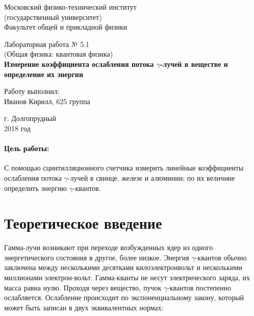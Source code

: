 \documentclass[12pt]{kiarticle}
\begin{document}
	
	\begin{titlepage}
		\begin{center}
			\large 	Московский физико-технический институт \\
			(государственный университет) \\
			Факультет общей и прикладной физики \\
			\vspace{0.2cm}
			
			\vspace{4.5cm}
			Лабораторная работа № 5.1 \\ \vspace{0.2cm}
			\large (Общая физика: квантовая физика) \\ \vspace{0.2cm}
			\LARGE \textbf{Измерение коэффициента ослабления потока $ \gamma $-лучей в веществе и определение их энергии}
		\end{center}
		\vspace{2.3cm} \large
		
		\begin{center}
			Работу выполнил: \\
			Иванов Кирилл,
			625 группа
			\vspace{10mm}		
			
		\end{center}
		
		\begin{center} \vspace{60mm}
			г. Долгопрудный \\
			2018 год
		\end{center}
	\end{titlepage}

	
	\paragraph*{Цель работы:} С помощью сцинтилляционного счетчика измерить линейные коэффициенты ослабления потока $ \gamma $-лучей в свинце, железе и алюминии; по их величине определить энергию $ \gamma $-квантов.
	
	\section{Теоретическое введение}
	
	Гамма-лучи возникают при переходе возбужденных ядер из одного энергетического состояния в другое, более низкое. Энергия $ \gamma $-квантов обычно заключена между несколькими десятками килоэлектронвольт и несколькими миллионами электрон-вольт. Гамма-кванты не несут электрического заряда, их масса равна нулю. Проходя через вещество, пучок $ \gamma $-квантов постепенно ослабляется. Ослабление происходит по экспоненциальному закону, который может быть записан в двух эквивалентных нормах:
	
\end{document}
